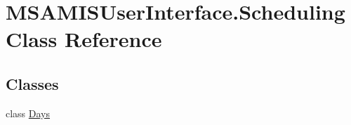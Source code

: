 \hypertarget{class_m_s_a_m_i_s_user_interface_1_1_scheduling}{}\section{M\+S\+A\+M\+I\+S\+User\+Interface.\+Scheduling Class Reference}
\label{class_m_s_a_m_i_s_user_interface_1_1_scheduling}
\subsection*{Classes}
\begin{DoxyCompactItemize}
\item 
class \hyperlink{class_m_s_a_m_i_s_user_interface_1_1_scheduling_1_1_days}{Days}
\end{DoxyCompactItemize}
